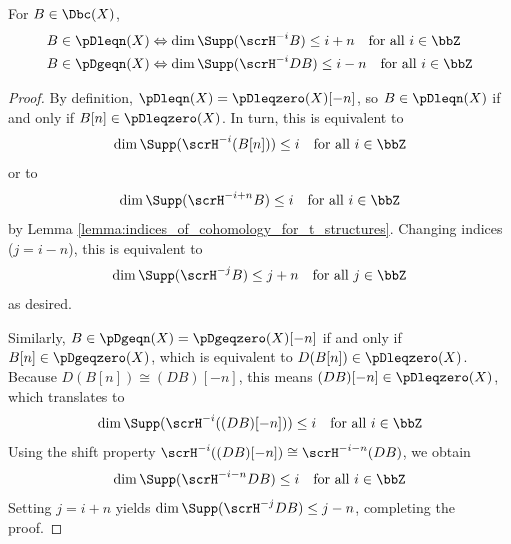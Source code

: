 \begin{lemma} \label{lemma:shifted_semiperverse_definition}
    For $B \in \Dbc(X)$, 
    \begin{align*}
        B &\in \pDleqn(X) \Leftrightarrow \dim \Supp(\scrH^{-i} B) \leq i+n \quad \text{for all } i \in \bbZ \\
        B &\in \pDgeqn(X) \Leftrightarrow \dim \Supp(\scrH^{-i} D B) \leq i-n \quad \text{for all } i \in \bbZ
    \end{align*}
\end{lemma}
\begin{proof}
    By definition, $\pDleqn(X) = \pDleqzero(X)[-n]$, so $B \in \pDleqn(X)$ if and only if $B[n] \in \pDleqzero(X)$. In turn, this is equivalent to 
    $$\dim \Supp(\scrH^{-i} (B[n])) \leq i \quad \text{for all } i \in \bbZ$$
    or to 
    $$\dim \Supp(\scrH^{-i+n} B) \leq i \quad \text{for all } i \in \bbZ$$
    by Lemma \ref{lemma:indices_of_cohomology_for_t_structures}. Changing indices ($j = i - n$), this is equivalent to 
    $$\dim \Supp(\scrH^{-j} B) \leq j+n \quad \text{for all } j \in \bbZ$$
    as desired. 

    Similarly, $B \in \pDgeqn(X) = \pDgeqzero(X)[-n]$ if and only if $B[n] \in \pDgeqzero(X)$, which is equivalent to $D(B[n]) \in \pDleqzero(X)$. Because $D(B[n]) \cong (DB)[-n]$, this means $(DB)[-n] \in \pDleqzero(X)$, which translates to
    $$\dim \Supp(\scrH^{-i} ((DB)[-n])) \leq i \quad \text{for all } i \in \bbZ$$
    Using the shift property $\scrH^{-i}((DB)[-n]) \cong \scrH^{-i-n}(DB)$, we obtain
    $$\dim \Supp(\scrH^{-i-n} DB) \leq i \quad \text{for all } i \in \bbZ$$
    Setting $j = i + n$ yields $\dim \Supp(\scrH^{-j} DB) \leq j-n$, completing the proof.
\end{proof}

